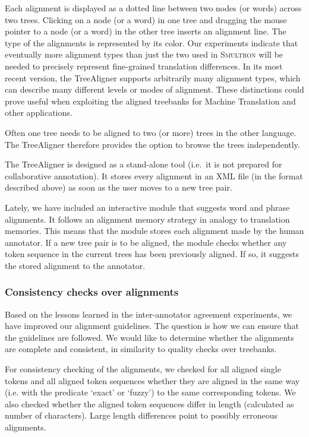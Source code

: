 \documentclass[output=paper]{LSP/langsci}
\begin{document}
Each alignment is displayed as a dotted line between two nodes (or words) across two trees. Clicking on a node (or a word) in one tree and dragging the mouse pointer to a node (or a word) in the other tree inserts an alignment line. The type of the alignments is represented by its color. Our experiments indicate that eventually more alignment types than just the two used in S\textsc{multron} will be needed to precisely represent fine-grained translation differences. In its most recent version, the TreeAligner supports arbitrarily many alignment types, which can describe many different levels or modes of alignment. These distinctions could prove useful when exploiting the aligned treebanks for Machine Translation and other applications. 

Often one tree needs to be aligned to two (or more) trees in the other language. The TreeAligner therefore provides the option to browse the trees independently. 

The TreeAligner is designed as a stand-alone tool (i.e.~it is not prepared for collaborative annotation). It stores every alignment in an XML file (in the format described above) as soon as the user moves to a new tree pair. 

Lately, we have included an interactive module that suggests word and phrase alignments. It follows an alignment memory strategy in analogy to translation memories. This means that the module stores each alignment made by the human annotator. If a new tree pair is to be aligned, the module checks whether any token sequence in the current trees has been previously aligned. If so, it suggests the stored alignment to the annotator. 

\subsubsection{Consistency checks over alignments}\label{sec:volk:2.2.6}

Based on the lessons learned in the inter-annotator agreement experiments, we have improved our alignment guidelines. The question is how we can ensure that the guidelines are followed. We would like to determine whether the alignments are complete and consistent, in similarity to quality checks over treebanks. 

For consistency checking of the alignments, we checked for all aligned single tokens and all aligned token sequences whether they are aligned in the same way (i.e. with the predicate `exact' or `fuzzy') to the same corresponding tokens. We also checked whether the aligned token sequences differ in length (calculated as number of characters). Large length differences point to possibly erroneous alignments. 
\end{document}
